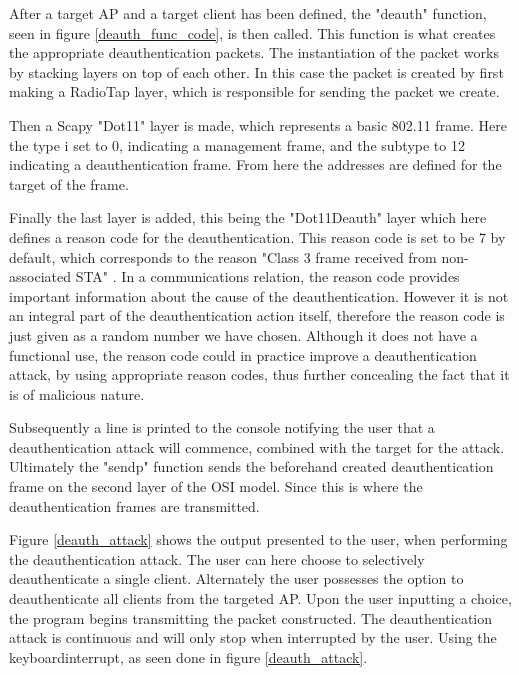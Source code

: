 After a target AP and a target client has been defined, the "deauth" function, seen in figure \ref{deauth_func_code}, is then called. This function is what creates the appropriate deauthentication packets. The instantiation of the packet works by stacking layers on top of each other. In this case the packet is created by first making a RadioTap layer, which is responsible for sending the packet we create.

Then a Scapy "Dot11" layer is made, which represents a basic 802.11 frame. Here the type i set to 0, indicating a management frame, and the subtype to 12 indicating a deauthentication frame. From here the addresses are defined for the target of the frame. 

Finally the last layer is added, this being the "Dot11Deauth" layer which here defines a reason code for the deauthentication. This reason code is set to be 7 by default, which corresponds to the reason "Class 3 frame received from non-associated STA" \cite{Cisco_Deathentication_reasoncodes}. In a communications relation, the reason code provides important information about the cause of the deauthentication. However it is not an integral part of the deauthentication action itself, therefore the reason code is just given as a random number we have chosen.
Although it does not have a functional use, the reason code could in practice improve a deauthentication attack, by using appropriate reason codes, thus further concealing the fact that it is of malicious nature.

Subsequently a line is printed to the console notifying the user that a deauthentication attack will commence, combined with the target for the attack.
Ultimately the "sendp" function sends the beforehand created deauthentication frame on the second layer of the OSI model. Since this is where the deauthentication frames are transmitted\cite{data-link-layer}.


Figure \ref{deauth_attack} shows the output presented to the user, when performing the deauthentication attack. The user can here choose to selectively deauthenticate a single client. Alternately the user possesses the option to deauthenticate all clients from the targeted AP. Upon the user inputting a choice, the program begins transmitting the packet constructed. The deauthentication attack is continuous and will only stop when interrupted by the user. Using the keyboardinterrupt, as seen done in figure \ref{deauth_attack}. 

